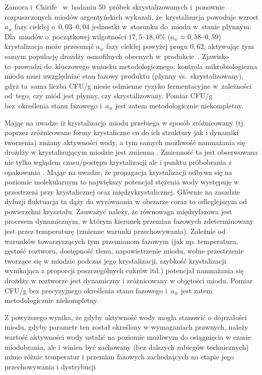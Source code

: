 Zamora i~Chirife~\cite{zamora2006} w~badaniu 50~próbek
skrystalizowanych i~ponownie rozpuszczonych miodów argentyńskich
wykazali, że~krystalizacja powoduje wzrost $a_w$ fazy ciekłej
o~$0{,}03$--$0{,}04$ jednostki w~stosunku do~miodu
w~stanie płynnym. Dla~miodów o~początkowej wilgotności
$17{,}5$--$18{,}0\%$ ($a_w \approx 0{,}58$--$0{,}59$)
krystalizacja może przesunąć $a_w$ fazy ciekłej powyżej
progu $0{,}62$, aktywując tym samym populację drożdży
osmofilnych obecnych w~produkcie~\cite{zamora2006,ijfans2019}.
Zjawisko to~prowadzi do~kluczowego wniosku metodologicznego:
kontrola mikrobiologiczna miodu musi uwzględniać stan fazowy
produktu (płynny vs.~skrystalizowany), gdyż ta~sama liczba
CFU/g niesie odmienne ryzyko fermentacyjne w~zależności od~tego,
czy miód jest płynny, czy skrystalizowany. Pomiar CFU/g bez~określenia
stanu fazowego i~$a_w$ jest zatem metodologicznie niekompletny.

Mając na uwadze iż krystalizacja miodu przebiega w sposób zróżnicowany (tj. poprzez zróżnicowane formy krystaliczne co do ich struktury jak i dynamiki tworzenia) zmiany aktywności wody, a tym samych możliwość namnażania się drożdży w krystalizującym miodzie jest zmienna . Zmienność ta jest obserwowana nie tylko wglądem czasu/postępu krystalizacji ale i punktu próbobrania z opakowania . Mając na uwadze, że propagacja krystalizacji odbywa się na poziomie molekularnym to największy potencjał stężenia wody występuję w przestrzeni przy krystalicznej oraz międzykrystalicznej. Głównie na zasadzie dyfuzji fluktuacja ta dąży do wyrównania w obszarze coraz to odleglejszym od powierzchni kryształu. Zauważyć należy, że  równowaga międzyfazowa jest procesem dynamicznym, w którym kierunek przemian fazowych zdeterminowany jest przez temperaturę (zmienne warunki przechowywania). Zależnie od warunków towarzyszących  tym przemianom fazowym  (jak np. temperatura, gęstość roztworu, dostępność tlenu, napowietrzenie miodu, wolne przestrzenie tworzące się w miodzie podczas jego krystalizacji, szybkość krystalizacji wynikająca z proporcji poszczególnych cukrów itd.) potencjał  namnażania się drożdży w roztworze jest dynamiczny i  zróżnicowany w objętości miodu.  Pomiar CFU/g bez precyzyjnego określenia stanu fazowego i~$a_w$  jest zatem metodologicznie niekompletny.

Z powyższego wynika, że gdyby aktywność wody mogła stanowić o dojrzałości miodu, gdyby parametr ten został określony w wymaganiach prawnych, należy wartość aktywności wody ustalić na poziomie możliwym do osiągnięcia w czasie miodobrania, ale i winien być  zachowany (bez dalszych zabiegów technicznych) mimo różnic temperatur i przemian fazowych zachodzących na etapie jego przechowywania i dystrybucji 


